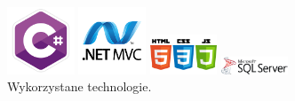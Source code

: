 \documentclass{article}
\begin{document}
\begin{figure}[h]
\centering
		\begin{minipage}{2cm}
			\includegraphics[width=2cm]{c_hasztag.png}
		\end{minipage}
		\begin{minipage}{2cm}
			\includegraphics[width=2cm]{asp_net-MVC.png}
		\end{minipage}
		\begin{minipage}{2cm}
			\includegraphics[width=2cm]{html.png}
		\end{minipage}
		\begin{minipage}{2cm}
			\includegraphics[width=2cm]{sql.png}
		\end{minipage}
	\caption{Wykorzystane technologie.}
	\label{fig:technologie}
\end{figure}
\end{document}
